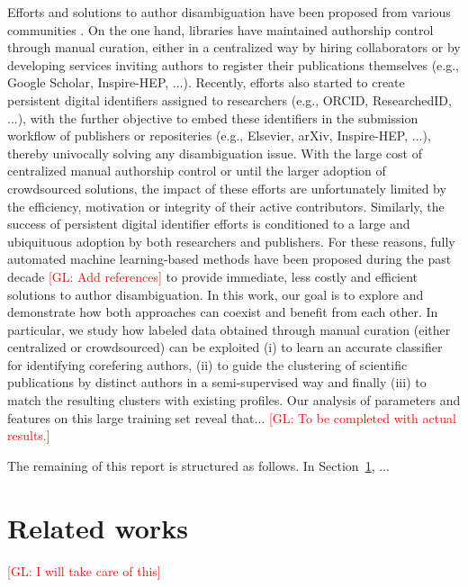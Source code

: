 \documentclass{article}
\newcommand{\glnote}[1]{\textcolor{red}{[GL: #1]}}
\begin{document}
Efforts and solutions to author disambiguation have been proposed from various
communities \citep{liu2014author}. On the one hand, libraries have maintained
authorship control through manual curation, either in a centralized way by
hiring collaborators or by developing services inviting authors to register
their publications themselves (e.g., Google Scholar, Inspire-HEP, ...). Recently,
efforts also started to create persistent digital identifiers assigned to researchers
(e.g., ORCID, ResearchedID, ...), with the further objective to embed these
identifiers in the submission workflow of publishers or repositeries (e.g.,
Elsevier, arXiv, Inspire-HEP, ...), thereby univocally solving any disambiguation
issue. With the large cost of centralized manual authorship control or until
the larger adoption of crowdsourced solutions, the impact of these efforts are
unfortunately limited by the efficiency, motivation or integrity of their
active contributors. Similarly, the success of persistent digital identifier
efforts is conditioned to a large and ubiquituous adoption by both researchers and publishers.
For these reasons, fully automated machine learning-based methods have been
proposed during the past decade \glnote{Add references} to provide immediate, less costly
and efficient solutions to author disambiguation. In this work, our goal
is to explore and demonstrate how both approaches can coexist and benefit from
each other.  In particular, we study how labeled data obtained through manual
curation (either centralized or crowdsourced) can be exploited (i) to learn an
accurate classifier for identifying corefering authors, (ii) to guide the
clustering of scientific publications by distinct authors in a semi-supervised
way and finally (iii) to match the resulting clusters with existing profiles.
Our analysis of parameters and features on this large training set reveal
that... \glnote{To be completed with actual results.}

The remaining of this report is structured as follows. In Section~\ref{related-works}, ...



\section{Related works}
\label{related-works}

\glnote{I will take care of this}

\end{document}
